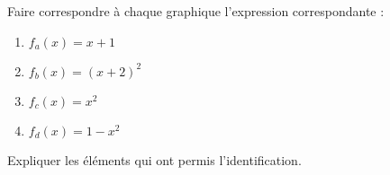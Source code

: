 
\begin{exercice}\label{exosmath-0252}

\let\Oldtheenumi\theenumi
\renewcommand{\theenumi}{(\alph{enumi})}
    Faire correspondre à chaque graphique l'expression correspondante :
    \begin{multicols}{2}
        \begin{enumerate}
            \item
                \( f_a(x)=x+1\)
            \item
                \( f_b(x)=(x+2)^2\)
            \item
                $f_c(x)=x^2$
            \item
                \( f_d(x)=1-x^2\)
        \end{enumerate}
    \end{multicols}
\let\theenumi\Oldtheenumi

    \begin{center}
   
    \end{center}

    Expliquer les éléments qui ont permis l'identification.

\end{exercice}
